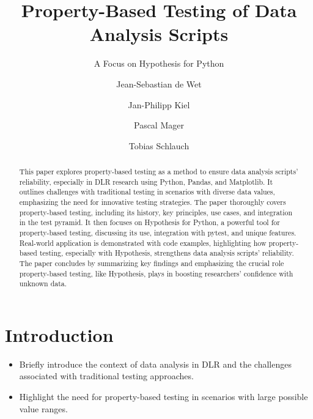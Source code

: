 \documentclass[runningheads]{llncs}
\begin{document}
%
\title{Property-Based Testing of Data Analysis Scripts}
\subtitle{A Focus on Hypothesis for Python}
%
%
\author{Jean-Sebastian de Wet \and
Jan-Philipp Kiel \and
Pascal Mager \and
Tobias Schlauch}
%
%
%
\maketitle              %
%
\begin{abstract}
This paper explores property-based testing as a method to ensure data analysis scripts' reliability, especially in DLR research using Python, Pandas, and Matplotlib. It outlines challenges with traditional testing in scenarios with diverse data values, emphasizing the need for innovative testing strategies. The paper thoroughly covers property-based testing, including its history, key principles, use cases, and integration in the test pyramid. It then focuses on Hypothesis for Python, a powerful tool for property-based testing, discussing its use, integration with pytest, and unique features. Real-world application is demonstrated with code examples, highlighting how property-based testing, especially with Hypothesis, strengthens data analysis scripts' reliability. The paper concludes by summarizing key findings and emphasizing the crucial role property-based testing, like Hypothesis, plays in boosting researchers' confidence with unknown data.

\end{abstract}
%
%
%
\section{Introduction}
\begin{itemize}
  \item Briefly introduce the context of data analysis in DLR and the challenges associated with traditional testing approaches.
  \item Highlight the need for property-based testing in scenarios with large possible value ranges.\cite{MacIver2019}
\end{itemize}
\end{document}
